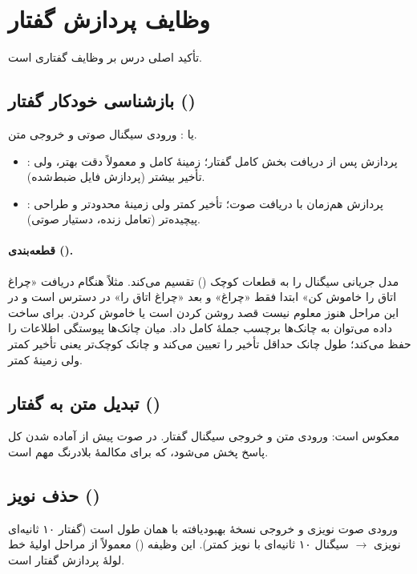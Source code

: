 \section{وظایف پردازش گفتار}
تأکید اصلی درس بر وظایف گفتاری است.

\subsection{بازشناسی خودکار گفتار ()}
 یا : ورودی سیگنال صوتی و خروجی متن.

\begin{itemize}
  \item {}: پردازش پس از دریافت بخش کامل گفتار؛ زمینهٔ کامل و معمولاً دقت بهتر، ولی تأخیر بیشتر (پردازش فایل ضبط‌شده).
  \item {}: پردازش هم‌زمان با دریافت صوت؛ تأخیر کمتر ولی زمینهٔ محدودتر و طراحی پیچیده‌تر (تعامل زنده، دستیار صوتی).
\end{itemize}

\paragraph{قطعه‌بندی ().} مدل جریانی سیگنال را به قطعات کوچک () تقسیم می‌کند. مثلاً هنگام دریافت «چراغ اتاق را خاموش کن» ابتدا فقط «چراغ» و بعد «چراغ اتاق را» در دسترس است و در این مراحل هنوز معلوم نیست قصد روشن کردن است یا خاموش کردن. برای ساخت داده می‌توان به چانک‌ها برچسب  جملهٔ کامل داد.  میان چانک‌ها پیوستگی اطلاعات را حفظ می‌کند؛ طول چانک حداقل تأخیر را تعیین می‌کند و چانک کوچک‌تر یعنی تأخیر کمتر ولی زمینهٔ کمتر.

\subsection{تبدیل متن به گفتار ()}
 معکوس  است: ورودی متن و خروجی سیگنال گفتار. در  صوت پیش از آماده شدن کل پاسخ پخش می‌شود، که برای مکالمهٔ بلادرنگ مهم است.

\subsection{حذف نویز ()}
ورودی صوت نویزی و خروجی نسخهٔ بهبودیافته با همان طول است (گفتار ۱۰ ثانیه‌ای نویزی $\rightarrow$ سیگنال ۱۰ ثانیه‌ای با نویز کمتر). این وظیفه () معمولاً از مراحل اولیهٔ خط لولهٔ پردازش گفتار است.

